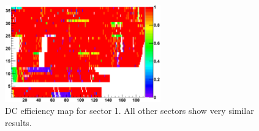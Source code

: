 \begin{figure}\begin{center}
\includegraphics[width=0.6\textwidth]{figures/calib/dc/Occupancy_g12_s1.eps}
\caption[DC Efficiency Map Sector 1]{\label{fig:calib.dc.eff}DC efficiency map for sector 1. All other sectors show very similar results.}
\end{center}\end{figure}

\FloatBarrier
